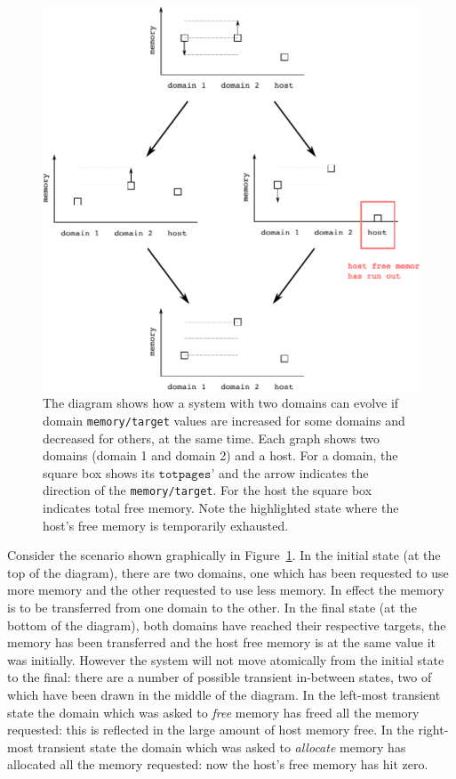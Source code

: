 \documentclass{article}
\begin{document}
\begin{figure}
\begin{center}
\includegraphics{fig/twophase}
\end{center}
\caption{The diagram shows how a system with two domains can evolve if domain \texttt{memory/target} values are increased for some domains and decreased for others, at the same time. Each graph shows two domains (domain 1 and domain 2) and a host. For a domain, the square box shows its $\texttt{totpages'}$ and the arrow indicates the direction of the \texttt{memory/target}. For the host the square box indicates total free memory. Note the highlighted state where the host's free memory is temporarily exhausted.}
\label{twophase}
\end{figure}

Consider the scenario shown graphically in Figure~\ref{twophase}. In the initial state (at the top of the diagram), there are two domains, one which has been requested to use more memory and the other requested to use less memory. In effect the memory is to be transferred from one domain to the other. In the final state (at the bottom of the diagram), both domains have reached their respective targets, the memory has been transferred and the host free memory is at the same value it was initially. However the system will not move atomically from the initial state to the final: there are a number of possible transient in-between states, two of which have been drawn in the middle of the diagram. In the left-most transient state the domain which was asked to {\em free} memory has freed all the memory requested: this is reflected in the large amount of host memory free. In the right-most transient state the domain which was asked to {\em allocate} memory has allocated all the memory requested: now the host's free memory has hit zero. 
\end{document}
